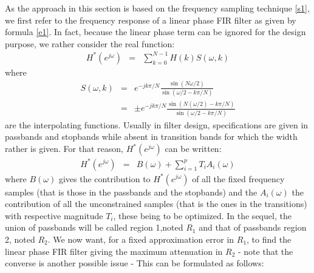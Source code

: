 {As the approach in this section is based on the frequency sampling 
technique \ref{s1}, we first refer to 
the frequency response of a linear phase FIR filter as given by formula \ref{e1}. In fact, because the linear phase term can 
be ignored for the design purpose, we rather consider the real function: 
\begin{eqnarray}
H^{*}(e^{j\omega}) &=& \sum_{k=0}^{N-1}H(k)S(\omega,k)
\label{e.optfir.1}
\end{eqnarray}
where 
\begin{eqnarray}
S(\omega,k) &=& e^{-jk\pi/N}\frac{\sin(N\omega/2)}{\sin(\omega/2-k\pi/N)}\nonumber\\
&=&\pm e^{-jk\pi/N}\frac{\sin(N(\omega/2)-k\pi/N)}{\sin(\omega/2-k\pi/N)}
\label{e.optfir.2}
\end{eqnarray}
are the interpolating functions.
Usually in filter design, specifications are given in passbands and stopbands 
while absent in transition bands for which the width rather is given. 
For that reason, $H^{*}(e^{j\omega})$ can be written: 
\begin{eqnarray}
H^{*}(e^{j\omega}) &=& B(\omega)+\sum_{i=1}^pT_iA_i(\omega)
\label{e.optfir.3}
\end{eqnarray}
where $B(\omega)$ gives the contribution to $H^{*}(e^{j\omega})$ of all the 
fixed frequency samples (that is those in the passbands and the stopbands) 
and the $A_i(\omega)$ the contribution of all the unconstrained samples 
(that is the ones in the transitions) with respective magnitude $T_i$, these 
being to be optimized. In the sequel, the union of passbands will be 
called region 1,noted $R_1$ and that of passbands region 2, noted $R_2$. 
We now want, for a fixed approximation error in $R_1$, to find the 
linear phase FIR filter giving the maximum attenuation in $R_2$ - note 
that the converse is another possible issue - This can be formulated 
as follows: 

}
